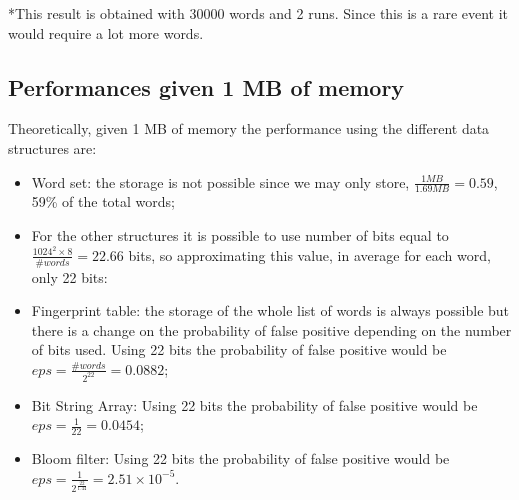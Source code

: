 \documentclass[twocolumn,letterpaper]{report}
\begin{document}
{\noindent
	*This result is obtained with 30000 words and 2 runs. Since this is a rare event it would require a lot more words.
				
				\subsection{Performances given 1 MB of memory}
				Theoretically, given 1 MB of memory the performance using the different data structures are:
				\begin{itemize}
					\item Word set: the storage is not possible since we may only store, $\frac{1 MB}{1.69 MB}=0.59$, 59\% of the total words; \\
					\item[] For the other structures it is possible to use number of bits equal to $\frac{1024^2 \times 8}{\#words}=22.66$ bits, so approximating this value, in average for each word, only 22 bits:
					\item Fingerprint table: the storage of the whole list of words is always possible but there is a change on the probability of false positive depending on the number of bits used. Using 22 bits the probability of false positive would be $eps=\frac{\#words}{2^{22}}=0.0882$; 
					\item Bit String Array: Using 22 bits the probability of false positive would be $eps=\frac{1}{22}=0.0454$;
					\item Bloom filter: Using 22 bits the probability of false positive would be $eps=\frac{1}{2^{\frac{22}{1.44}}}=2.51 \times 10^{-5}$. 
				\end{itemize}
				

}
\end{document}
